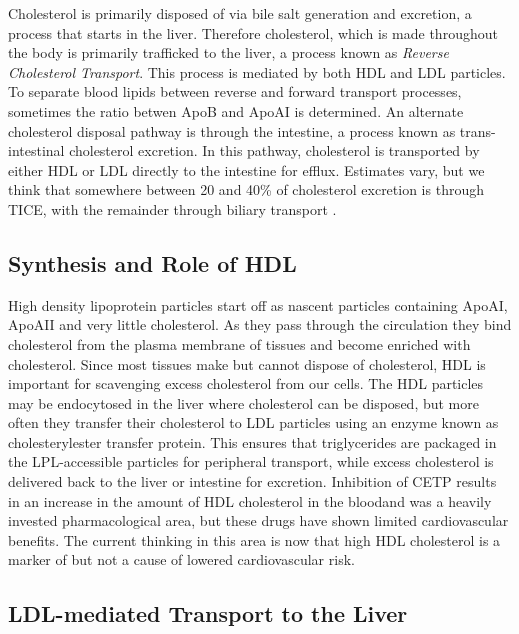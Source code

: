 \documentclass{tufte-handout}
\begin{document}
Cholesterol is primarily disposed of via bile salt generation and excretion, a process that starts in the liver.  Therefore cholesterol, which is made throughout the body is primarily trafficked to the liver, a process known as \emph{Reverse Cholesterol Transport}.  This process is mediated by both HDL and LDL particles.  To separate blood lipids between reverse and forward transport processes, sometimes the ratio betwen ApoB and ApoAI is determined.  An alternate cholesterol disposal pathway is through the intestine, a process known as trans-intestinal cholesterol excretion.  In this pathway, cholesterol is transported by either HDL or LDL directly to the intestine for efflux.  Estimates vary, but we think that somewhere between 20 and 40\% of cholesterol excretion is through TICE, with the remainder through biliary transport \citep{Temel2015}.

\subsection{Synthesis and Role of HDL}

High density lipoprotein particles start off as nascent particles containing ApoAI, ApoAII and very little cholesterol.  As they pass through the circulation they bind cholesterol from the plasma membrane of tissues and become enriched with cholesterol.  Since most tissues make but cannot dispose of cholesterol, HDL is important for scavenging excess cholesterol from our cells. The HDL particles may be endocytosed in the liver where cholesterol can be disposed, but more often they transfer their cholesterol to LDL particles using an enzyme known as cholesterylester transfer protein.  This ensures that triglycerides are packaged in the LPL-accessible particles for peripheral transport, while excess cholesterol is delivered back to the liver or intestine for excretion.   Inhibition of CETP results in an increase in the amount of  HDL cholesterol in the bloodand was a heavily invested pharmacological area, but these drugs have shown limited cardiovascular benefits.  The current thinking in this area is now that high HDL cholesterol is a marker of but not a cause of lowered cardiovascular risk.

\subsection{LDL-mediated Transport to the Liver}
\end{document}

